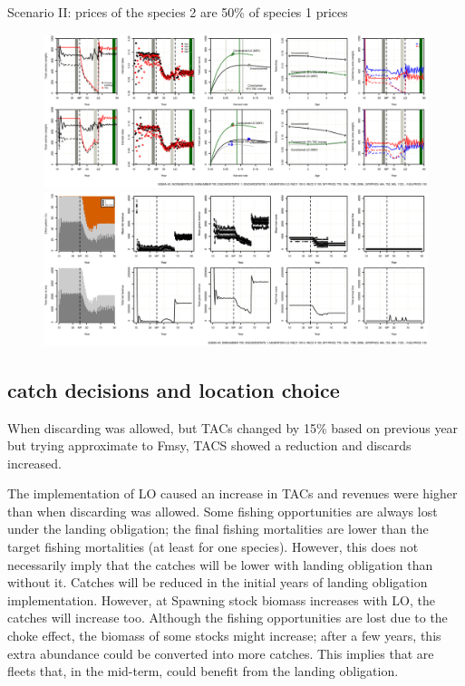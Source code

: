 \documentclass[12pt,oneline,a4paper,numbib]{ouparticle}
\numberwithin{equation}{subsection} %
\begin{document}
Scenario II: prices of the species 2 are 50\% of species 1 prices
\begin{figure}[!h]
\centering
\begin{minipage}{.45\textwidth}
\includegraphics[width=0.9\textheight, angle=90]{Figures/Catch_scenarioII.eps} 
\end{minipage}
\hfill
\begin{minipage}{.45\textwidth}
\includegraphics[width=0.9\textheight, angle=90]{Figures/Effort_scenarioII.eps} 
\end{minipage}
\caption{}
\end{figure}


\subsection{ catch decisions and location choice}
\label{sec3.1}
When discarding was allowed, but TACs changed by 15\% based on previous year but trying approximate to Fmsy, TACS showed a reduction and discards increased. 

The implementation of LO caused an increase in TACs and revenues were higher than when discarding was allowed. Some fishing opportunities are always lost under the landing obligation; the final fishing mortalities are lower than the target fishing mortalities (at least for one species). However, this does not necessarily imply that the catches will be lower with landing obligation than without it. Catches will be reduced in the initial years of landing obligation implementation. However, at Spawning stock biomass increases with LO, the catches will increase too. Although the fishing opportunities are lost due to the choke effect, the biomass of some stocks might increase; after a few years, this extra abundance could be converted into more catches. This implies that are fleets that, in the mid-term, could benefit from the landing obligation.
\end{document}
